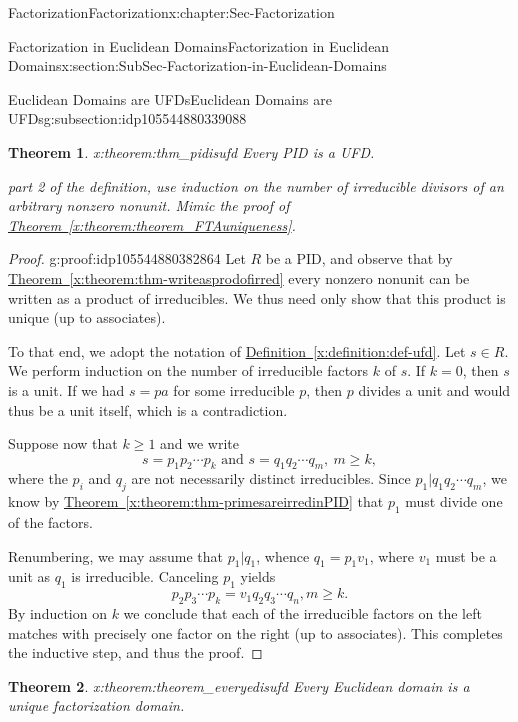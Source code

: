 \documentclass[oneside,10pt,]{book}
\newcommand{\xreffont}{\relax}
\numberwithin{equation}{section}
\renewcommand{\ge}{\geqslant}
\newtheorem{theorem}{Theorem}[section]
\begin{document}
\begin{chapterptx}{Factorization}{}{Factorization}{}{}{x:chapter:Sec-Factorization}
\begin{sectionptx}{Factorization in Euclidean Domains}{}{Factorization in Euclidean Domains}{}{}{x:section:SubSec-Factorization-in-Euclidean-Domains}
\begin{subsectionptx}{Euclidean Domains are UFDs}{}{Euclidean Domains are UFDs}{}{}{g:subsection:idp105544880339088}
\begin{theorem}{}{}{x:theorem:thm_pidisufd}%
Every PID is a UFD.%
\par\smallskip%
\noindentFor part 2 of the definition, use induction on the number of irreducible divisors of an arbitrary nonzero nonunit. Mimic the proof of \hyperref[x:theorem:theorem_FTAuniqueness]{Theorem~{\xreffont\ref{x:theorem:theorem_FTAuniqueness}}}.\end{theorem}
\begin{proof}{}{g:proof:idp105544880382864}
Let \(R\) be a PID, and observe that by \hyperref[x:theorem:thm-writeasprodofirred]{Theorem~{\xreffont\ref{x:theorem:thm-writeasprodofirred}}} every nonzero nonunit can be written as a product of irreducibles. We thus need only show that this product is unique (up to associates).%
\par
To that end, we adopt the notation of \hyperref[x:definition:def-ufd]{Definition~{\xreffont\ref{x:definition:def-ufd}}}. Let \(s\in R\). We perform induction on the number of irreducible factors \(k\) of \(s\). If \(k=0\), then \(s\) is a unit. If we had \(s = pa\) for some irreducible \(p\), then \(p\) divides a unit and would thus be a unit itself, which is a contradiction.%
\par
Suppose now that \(k\ge 1\) and we write%
\begin{equation*}
s = p_1 p_2 \cdots p_k \text{ and }  s = q_1 q_2 \cdots q_m, \ m \ge k,
\end{equation*}
where the \(p_i\) and \(q_j\) are not necessarily distinct irreducibles. Since \(p_1 | q_1 q_2 \cdots q_m\), we know by \hyperref[x:theorem:thm-primesareirredinPID]{Theorem~{\xreffont\ref{x:theorem:thm-primesareirredinPID}}} that \(p_1\) must divide one of the factors.%
\par
Renumbering, we may assume that \(p_1 | q_1\), whence \(q_1 = p_1 v_1\), where \(v_1\) must be a unit as \(q_1\) is irreducible. Canceling \(p_1\) yields%
\begin{equation*}
p_2 p_3 \cdots p_k = v_1 q_2 q_3 \cdots q_n, m\ge k.
\end{equation*}
By induction on \(k\) we conclude that each of the irreducible factors on the left matches with precisely one factor on the right (up to associates). This completes the inductive step, and thus the proof.%
\end{proof}
\begin{theorem}{}{}{x:theorem:theorem_everyedisufd}%
Every Euclidean domain is a unique factorization domain.%
\end{theorem}

\end{subsectionptx}
\end{sectionptx}
\end{chapterptx}
\end{document}
